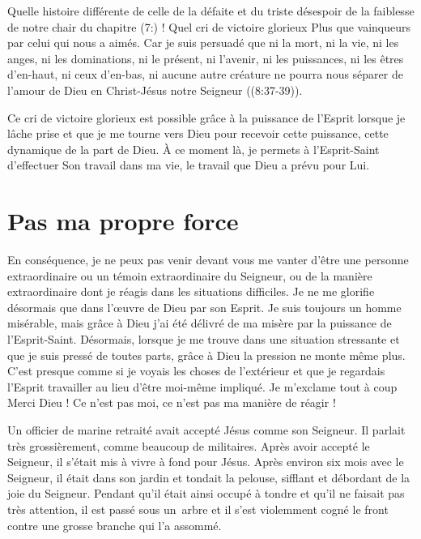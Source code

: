 Quelle histoire différente de celle de la défaite et du triste désespoir
 de la faiblesse de notre chair du chapitre (7:) !
 Quel cri de victoire glorieux\frcolon{}
 \Og Plus que vainqueurs par celui qui nous a aimés.
 Car je suis persuadé que ni la mort, ni la vie, ni les anges,
 ni les dominations, ni le présent, ni l'avenir, ni les puissances,
 ni les êtres d'en-haut, ni ceux d'en-bas, ni aucune autre créature
 ne pourra nous séparer de l'amour de Dieu en Christ-Jésus
 notre Seigneur \Fg{} ((8:37-39)).

Ce cri de victoire glorieux est possible grâce à la puissance de l'Es\-prit
 lorsque je lâche prise et que je me tourne vers Dieu pour recevoir
 cette puissance, cette dynamique de la part de Dieu. À ce moment là,
 je permets à l'Esprit-Saint d'effectuer Son travail dans ma vie,
 le travail que Dieu a prévu pour Lui.


\section{Pas ma propre force}

En conséquence, je ne peux pas venir devant vous
 me vanter d'être une personne extraordinaire
 ou un témoin extraordinaire du Seigneur,
 ou de la manière extraordinaire dont je réagis dans les
 situations difficiles.
 Je ne me glorifie désormais que dans l'\oe{}uvre de Dieu par son Esprit.
 Je suis toujours un homme misérable, mais grâce à Dieu
 j'ai été délivré de ma misère par la puissance de l'Esprit-Saint.
 Désormais, lorsque je me trouve dans une situation stressante
 et que je suis pressé de toutes parts, grâce à Dieu la pression
 ne monte même plus.
 C'est presque comme si je voyais les choses de l'extérieur et que je regardais l'Esprit travailler
 au lieu d'être moi-même impliqué.
 Je m'exclame tout à coup\frcolon{}
 \Og Merci Dieu ! Ce n'est pas moi,
 ce n'est pas ma manière de réagir ! \Fg{}

Un officier de marine retraité avait accepté Jésus comme son Seigneur.
 Il parlait très grossièrement, comme beaucoup de militaires.
 Après avoir accepté le Seigneur, il s'était mis à vivre à fond pour Jésus.
 Après environ six mois avec le Seigneur, il était dans son jardin
 et tondait la pelouse, sifflant et débordant
 de la joie du Seigneur.
 Pendant qu'il était ainsi occupé à tondre et qu'il ne faisait pas très attention,
 il est passé sous un~arbre et il s'est violemment cogné le front contre une grosse branche
 qui l'a assommé.

